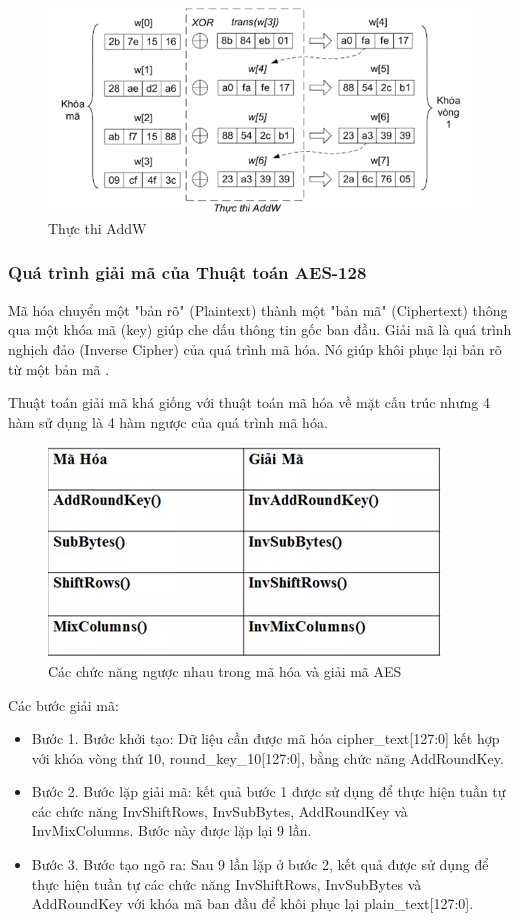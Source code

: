 \begin{itemize}
\begin{figure}[H]
    \centering
    \includegraphics{Ảnh/hiền/addw.png}
    \caption{Thực thi AddW}
\end{figure}
\end{itemize}
\subsubsection{Quá trình giải mã của Thuật toán AES-128}

Mã hóa chuyển một "bản rõ" (Plaintext) thành một "bản mã" (Ciphertext) thông qua một khóa mã (key) giúp che dấu thông tin gốc ban đầu. Giải mã là quá trình nghịch đảo (Inverse Cipher) của quá trình mã hóa. Nó giúp khôi phục lại bản rõ từ một bản mã \cite{abdullah2017advanced}.

Thuật toán giải mã khá giống với thuật toán mã hóa về mặt cấu trúc nhưng 4 hàm sử dụng là 4 hàm ngược của quá trình mã hóa.
\begin{figure}[H]
    \centering
    \includegraphics[scale=1]{pic/huê/ngc mã hóa.png}
    
    
    \caption{Các chức năng ngược nhau trong mã hóa và giải mã AES}
\end{figure}

Các bước giải mã:
\begin{itemize}
    \item Bước 1. Bước khởi tạo: Dữ liệu cần được mã hóa cipher\_text[127:0] kết hợp với khóa vòng thứ 10, round\_key\_10[127:0], bằng chức năng AddRoundKey.
    \item Bước 2. Bước lặp giải mã: kết quả bước 1 được sử dụng để thực hiện tuần tự các chức năng InvShiftRows, InvSubBytes, AddRoundKey và InvMixColumns. Bước này được lặp lại 9 lần.
    \item Bước 3. Bước tạo ngõ ra: Sau 9 lần lặp ở bước 2, kết quả được sử dụng để thực hiện tuần tự các chức năng InvShiftRows, InvSubBytes và AddRoundKey với khóa mã ban đầu để khôi phục lại plain\_text[127:0].
\end{itemize}

